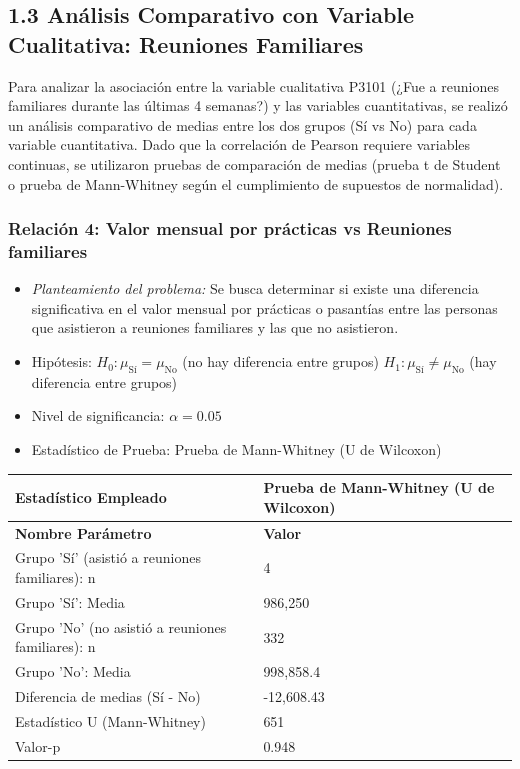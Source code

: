 \documentclass[12pt,a4paper]{article}
\begin{document}
\subsection*{1.3 Análisis Comparativo con Variable Cualitativa: Reuniones Familiares}

Para analizar la asociación entre la variable cualitativa P3101 (¿Fue a reuniones familiares durante las últimas 4 semanas?) y las variables cuantitativas, se realizó un análisis comparativo de medias entre los dos grupos (Sí vs No) para cada variable cuantitativa. Dado que la correlación de Pearson requiere variables continuas, se utilizaron pruebas de comparación de medias (prueba t de Student o prueba de Mann-Whitney según el cumplimiento de supuestos de normalidad).

\subsubsection*{Relación 4: Valor mensual por prácticas vs Reuniones familiares}

\begin{itemize}
    \item \textit{Planteamiento del problema:} Se busca determinar si existe una diferencia significativa en el valor mensual por prácticas o pasantías entre las personas que asistieron a reuniones familiares y las que no asistieron.
    \item Hipótesis: \quad $H_0: \mu_{\text{Sí}} = \mu_{\text{No}}$ (no hay diferencia entre grupos) \hspace{1cm} $H_1: \mu_{\text{Sí}} \neq \mu_{\text{No}}$ (hay diferencia entre grupos)
    \item Nivel de significancia: $\alpha = 0.05$
    \item Estadístico de Prueba: Prueba de Mann-Whitney (U de Wilcoxon)
\end{itemize}

\begin{tabular}{|m{7cm}|m{7cm}|}
\hline
\textbf{Estadístico Empleado} & Prueba de Mann-Whitney (U de Wilcoxon) \\ \hline
\textbf{Nombre Parámetro} & \textbf{Valor} \\ \hline
Grupo 'Sí' (asistió a reuniones familiares): n & 4 \\ \hline
Grupo 'Sí': Media & 986,250 \\ \hline
Grupo 'No' (no asistió a reuniones familiares): n & 332 \\ \hline
Grupo 'No': Media & 998,858.4 \\ \hline
Diferencia de medias (Sí - No) & -12,608.43 \\ \hline
Estadístico U (Mann-Whitney) & 651 \\ \hline
Valor-p & 0.948 \\ \hline
\end{tabular}
\end{document}

